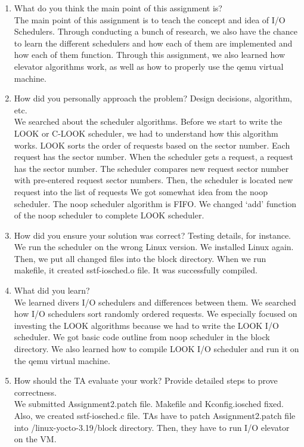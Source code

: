 \documentclass[10pt, letterpaper]{article}
\begin{document}
    \begin{enumerate}
        \item What do you think the main point of this assignment is? \\
            The main point of this assignment is to teach the concept and idea of I/O Schedulers. Through conducting a bunch of research, we also have the chance to learn the different schedulers and how each of them are implemented and how each of them function. Through this assignment, we also learned how elevator algorithms work, as well as how to properly use the qemu virtual machine. 
            
        \item How did you personally approach the problem? Design decisions, algorithm, etc. \\
            We searched about the scheduler algorithms. Before we start to write the LOOK or C-LOOK scheduler, we had to understand how this algorithm works. LOOK sorts the order of requests based on the sector number. Each request has the sector number. When the scheduler gets a request, a request has the sector number. The scheduler compares new request sector number with pre-entered request sector numbers. Then, the scheduler is located new request into the list of requests We got somewhat idea from the noop scheduler. The noop scheduler algorithm is FIFO. We changed ‘add’ function of the noop scheduler to complete LOOK scheduler. 
            
        \item How did you ensure your solution was correct? Testing details, for instance. \\
         We run the scheduler on the wrong Linux version. We installed Linux again. Then, we put all changed files into the block directory. When we run makefile, it created sstf-iosched.o file. It was successfully compiled.

        \item What did you learn? \\
            We learned divers I/O schedulers and differences between them. We searched how I/O schedulers sort randomly ordered requests. We especially focused on investing the LOOK algorithms because we had to write the LOOK I/O scheduler. We got basic code outline from noop scheduler in the block directory. We also learned how to compile LOOK I/O scheduler and run it on the qemu virtual machine.   

            
        \item How should the TA evaluate your work? Provide detailed steps to prove correctness. \\
            We submitted Assignment2.patch file. Makefile and  Kconfig.iosched fixed. Also, we created sstf-iosched.c file. TAs have to patch Assignment2.patch file into /linux-yocto-3.19/block directory. Then, they have to run I/O elevator on the VM. 

            
    \end{enumerate}
 
\end{document}

